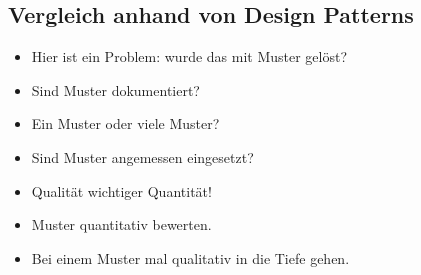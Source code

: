 \subsection{Vergleich anhand von Design Patterns}
\color{red}
\begin{itemize}
    \item Hier ist ein Problem: wurde das mit Muster gelöst?
    \item Sind Muster dokumentiert?
    \item Ein Muster oder viele Muster?
    \item Sind Muster angemessen eingesetzt?
    \item Qualität wichtiger Quantität!
    \item Muster quantitativ bewerten.
    \item Bei einem Muster mal qualitativ in die Tiefe gehen.
\end{itemize}
\color{black}
